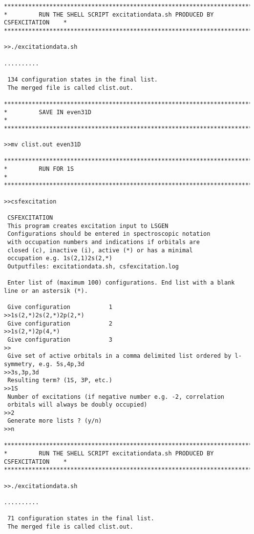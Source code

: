 \documentclass[fleqn,10pt]{book}
\begin{document}
\begin{verbatim}
*******************************************************************************
*         RUN THE SHELL SCRIPT excitationdata.sh PRODUCED BY CSFEXCITATION    *
*******************************************************************************

>>./excitationdata.sh

..........

 134 configuration states in the final list.
 The merged file is called clist.out.

*******************************************************************************
*         SAVE IN even31D                                                     *
*******************************************************************************

>>mv clist.out even31D

*******************************************************************************
*         RUN FOR 1S                                                          *
*******************************************************************************

>>csfexcitation

 CSFEXCITATION
 This program creates excitation input to LSGEN
 Configurations should be entered in spectroscopic notation
 with occupation numbers and indications if orbitals are
 closed (c), inactive (i), active (*) or has a minimal
 occupation e.g. 1s(2,1)2s(2,*)
 Outputfiles: excitationdata.sh, csfexcitation.log

 Enter list of (maximum 100) configurations. End list with a blank line or an astersik (*).

 Give configuration           1
>>1s(2,*)2s(2,*)2p(2,*)
 Give configuration           2
>>1s(2,*)2p(4,*)
 Give configuration           3
>>
 Give set of active orbitals in a comma delimited list ordered by l-symmetry, e.g. 5s,4p,3d
>>3s,3p,3d
 Resulting term? (1S, 3P, etc.)
>>1S
 Number of excitations (if negative number e.g. -2, correlation 
 orbitals will always be doubly occupied)                        
>>2
 Generate more lists ? (y/n)
>>n

*******************************************************************************
*         RUN THE SHELL SCRIPT excitationdata.sh PRODUCED BY CSFEXCITATION    *
*******************************************************************************

>>./excitationdata.sh

..........

 71 configuration states in the final list.
 The merged file is called clist.out.


\end{verbatim}
\end{document}
